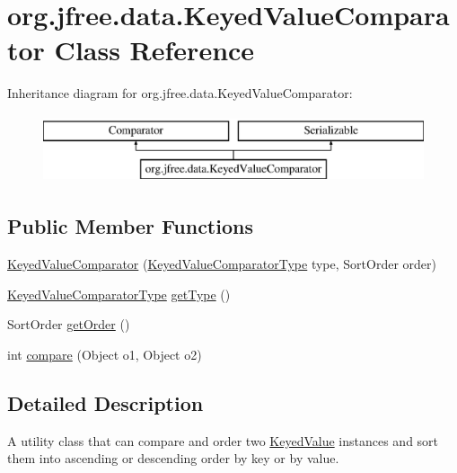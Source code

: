 \hypertarget{classorg_1_1jfree_1_1data_1_1_keyed_value_comparator}{}\section{org.\+jfree.\+data.\+Keyed\+Value\+Comparator Class Reference}
\label{classorg_1_1jfree_1_1data_1_1_keyed_value_comparator}
Inheritance diagram for org.\+jfree.\+data.\+Keyed\+Value\+Comparator\+:\begin{figure}[H]
\begin{center}
\leavevmode
\includegraphics[height=2.000000cm]{classorg_1_1jfree_1_1data_1_1_keyed_value_comparator}
\end{center}
\end{figure}
\subsection*{Public Member Functions}
\begin{DoxyCompactItemize}
\item 
\mbox{\hyperlink{classorg_1_1jfree_1_1data_1_1_keyed_value_comparator_a8c9ceb8e0aaa8980cc331bb4e176d71f}{Keyed\+Value\+Comparator}} (\mbox{\hyperlink{classorg_1_1jfree_1_1data_1_1_keyed_value_comparator_type}{Keyed\+Value\+Comparator\+Type}} type, Sort\+Order order)
\item 
\mbox{\hyperlink{classorg_1_1jfree_1_1data_1_1_keyed_value_comparator_type}{Keyed\+Value\+Comparator\+Type}} \mbox{\hyperlink{classorg_1_1jfree_1_1data_1_1_keyed_value_comparator_ab94fe2f9f46ccfd543fc6a0fb9b6632f}{get\+Type}} ()
\item 
Sort\+Order \mbox{\hyperlink{classorg_1_1jfree_1_1data_1_1_keyed_value_comparator_a617b15fed2cc0f6ec2b3c0b921d5e79b}{get\+Order}} ()
\item 
int \mbox{\hyperlink{classorg_1_1jfree_1_1data_1_1_keyed_value_comparator_a0417e14863a03330be428c63cb16d3ea}{compare}} (Object o1, Object o2)
\end{DoxyCompactItemize}


\subsection{Detailed Description}
A utility class that can compare and order two \mbox{\hyperlink{interfaceorg_1_1jfree_1_1data_1_1_keyed_value}{Keyed\+Value}} instances and sort them into ascending or descending order by key or by value. 

